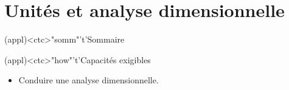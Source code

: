 \documentclass[../../main/main.tex]{subfiles}
\begin{document}
\setcounter{chapter}{0}


\chapter{Unit\'es et analyse dimensionnelle}


\begin{tcn}(appl)<ctc>"somm"'t'{Sommaire}
	\let\item\olditem
	\vspace{-15pt}
	\minitoc
	\vspace{-25pt}
\end{tcn}

\begin{tcn}(appl)<ctc>"how"'t'{Capacités exigibles}
	\begin{itemize}[label=\rcheck]
		\item Conduire une analyse dimensionnelle.
	\end{itemize}
\end{tcn}
\end{document}
